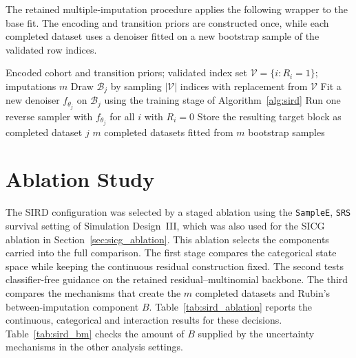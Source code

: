 The retained multiple-imputation procedure applies the following wrapper to the base fit. The encoding and transition priors are constructed once, while each completed dataset uses a denoiser fitted on a new bootstrap sample of the validated row indices.

\begin{algorithm}[t]
\caption{Sample imputation via conditional residual denoising diffusion networks (SIRD): retained bootstrap procedure}
\label{alg:sird_bootstrap}
\begin{algorithmic}[1]
\Require Encoded cohort and transition priors; validated index set $\mathcal V=\{i:R_i=1\}$; imputations $m$
    \State Draw $\mathcal B_j$ by sampling $|\mathcal V|$ indices with replacement from $\mathcal V$
    \State Fit a new denoiser $f_{\theta_j}$ on $\mathcal B_j$ using the training stage of Algorithm~\ref{alg:sird}
    \State Run one reverse sampler with $f_{\theta_j}$ for all $i$ with $R_i=0$
    \State Store the resulting target block as completed dataset $j$
\EndFor
\Ensure $m$ completed datasets fitted from $m$ bootstrap samples
\end{algorithmic}
\end{algorithm}


\section{Ablation Study}
\label{sec:sird_ablation}

The SIRD configuration was selected by a staged ablation using the \texttt{SampleE}, \texttt{SRS} survival setting of Simulation Design~III, which was also used for the SICG ablation in Section~\ref{sec:sicg_ablation}. This ablation selects the components carried into the full comparison. The first stage compares the categorical state space while keeping the continuous residual construction fixed. The second tests classifier-free guidance on the retained residual--multinomial backbone. The third compares the mechanisms that create the \(m\) completed datasets and Rubin's between-imputation component \(B\). Table~\ref{tab:sird_ablation} reports the continuous, categorical and interaction results for these decisions. Table~\ref{tab:sird_bm} checks the amount of \(B\) supplied by the uncertainty mechanisms in the other analysis settings.

